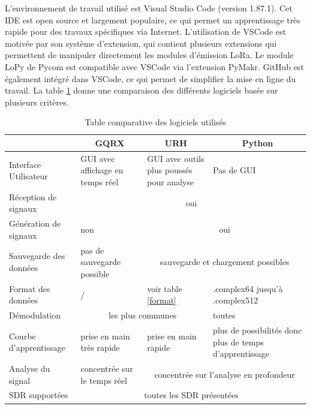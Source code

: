 \newpage

L'environnement de travail utilisé est Visual Studio Code (version 1.87.1). Cet \ac{IDE} est open source et largement populaire, ce qui permet un apprentissage très rapide pour des travaux spécifiques via Internet. L'utilisation de VSCode est motivée par son système d'extension, qui contient plusieurs extensions qui permettent de manipuler directement les modules d'émission \ac{LoRa}. Le module LoPy de Pycom est compatible avec VSCode via l'extension PyMakr. GitHub est également intégré dans VSCode, ce qui permet de simplifier la mise en ligne du travail. La table \ref{table2} donne une comparaison des différents logiciels basée sur plusieurs critères.

\begin{table}[h]
\centering
\begin{tabular}{|p{4cm}|p{2cm}|p{2cm}|p{3.5cm}|}
\hline
\multicolumn{1}{|c|}{} & \multicolumn{1}{c|}{GQRX} & \multicolumn{1}{c|}{URH} & \multicolumn{1}{c|}{Python}\\
\hline
Interface Utilisateur & GUI avec affichage en temps réel & GUI avec outils plus poussés pour analyse & Pas de GUI \\
\hline
Réception de signaux & \multicolumn{3}{c|}{oui} \\
\hline
Génération de signaux & non & \multicolumn{2}{c|}{oui} \\
\hline
Sauvegarde des données & pas de sauvegarde possible & \multicolumn{2}{c|}{sauvegarde et chargement possibles} \\
\hline
Format des données & / & voir table \ref{format} & .complex64 jusqu'à .complex512 \\
\hline
Démodulation &  \multicolumn{2}{c|}{les plus communes\footnotemark[12]}  & toutes\\
\hline
Courbe d'apprentissage & prise en main très rapide & prise en main rapide & plus de possibilités donc plus de temps d'apprentissage \\
\hline
Analyse du signal & concentrée sur le temps réel & \multicolumn{2}{c|}{concentrée sur l'analyse en profondeur} \\
\hline
SDR supportées & \multicolumn{3}{c|}{toutes les SDR présentées} \\
\hline
\end{tabular}
\caption{Table comparative des logiciels utilisés}
\label{table2}
\end{table}



